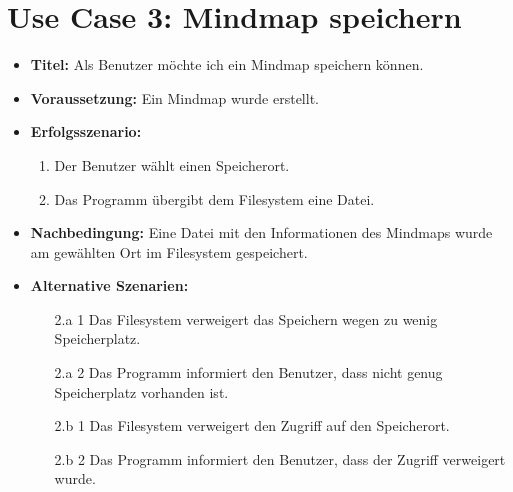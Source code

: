 \section*{Use Case 3: Mindmap speichern}
\begin{itemize}
\item \textbf{Titel:} Als Benutzer möchte ich ein Mindmap speichern können.
\item \textbf{Voraussetzung:} Ein Mindmap wurde erstellt.
\item \textbf{Erfolgsszenario:}
	\begin{enumerate}
	\item Der Benutzer wählt einen Speicherort.
	\item Das Programm übergibt dem Filesystem eine Datei.
	\end{enumerate}
\item \textbf{Nachbedingung:} Eine Datei mit den Informationen des Mindmaps wurde am gewählten Ort im Filesystem gespeichert.
\item \textbf{Alternative Szenarien:}
	\begin{enumerate}
	\item [2.a 1] Das Filesystem verweigert das Speichern wegen zu wenig Speicherplatz.
	\item [2.a 2] Das Programm informiert den Benutzer, dass nicht genug Speicherplatz vorhanden ist.
	\item []
	\item [2.b 1] Das Filesystem verweigert den Zugriff auf den Speicherort.
	\item [2.b 2] Das Programm informiert den Benutzer, dass der Zugriff verweigert wurde.
	\end{enumerate}
\end{itemize}

